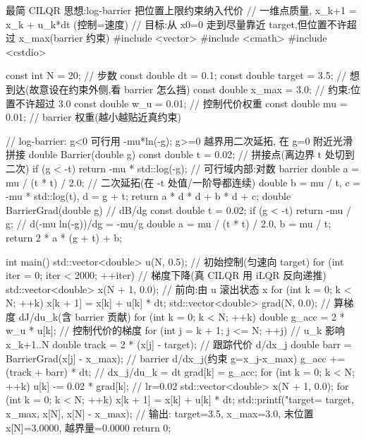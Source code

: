 \begin{codebox}[C++]{最简 CILQR 思想:log-barrier 把位置上限约束纳入代价}
// 一维点质量, x_{k+1} = x_k + u_k*dt (控制=速度)
// 目标:从 x0=0 走到尽量靠近 target,但位置不许超过 x_max(barrier 约束)
#include <vector>
#include <cmath>
#include <cstdio>

const int    N      = 20;       // 步数
const double dt     = 0.1;
const double target = 3.5;      // 想到达(故意设在约束外侧,看 barrier 怎么挡)
const double x_max  = 3.0;      // 约束:位置不许超过 3.0
const double w_u    = 0.01;     // 控制代价权重
const double mu     = 0.01;     // barrier 权重(越小越贴近真约束)

// log-barrier: g<0 可行用 -mu*ln(-g); g>=0 越界用二次延拓, 在 g=0 附近光滑拼接
double Barrier(double g) {
  const double t = 0.02;                          // 拼接点(离边界 t 处切到二次)
  if (g < -t) return -mu * std::log(-g);          // 可行域内部:对数 barrier
  double a = mu / (t * t) / 2.0;                  // 二次延拓(在 -t 处值/一阶导都连续)
  double b = mu / t, c = -mu * std::log(t), d = g + t;
  return a * d * d + b * d + c;
}
double BarrierGrad(double g) {                    // dB/dg
  const double t = 0.02;
  if (g < -t) return -mu / g;                     // d(-mu ln(-g))/dg = -mu/g
  double a = mu / (t * t) / 2.0, b = mu / t;
  return 2 * a * (g + t) + b;
}

int main() {
  std::vector<double> u(N, 0.5);                  // 初始控制(匀速向 target)
  for (int iter = 0; iter < 2000; ++iter) {       // 梯度下降(真 CILQR 用 iLQR 反向递推)
    std::vector<double> x(N + 1, 0.0);            // 前向:由 u 滚出状态 x
    for (int k = 0; k < N; ++k) x[k + 1] = x[k] + u[k] * dt;
    std::vector<double> grad(N, 0.0);             // 算梯度 dJ/du_k(含 barrier 贡献)
    for (int k = 0; k < N; ++k) {
      double g_acc = 2 * w_u * u[k];              // 控制代价的梯度
      for (int j = k + 1; j <= N; ++j) {          // u_k 影响 x_{k+1..N}
        double track = 2 * (x[j] - target);       // 跟踪代价 d/dx_j
        double barr  = BarrierGrad(x[j] - x_max); // barrier d/dx_j(约束 g=x_j-x_max)
        g_acc += (track + barr) * dt;             // dx_j/du_k = dt
      }
      grad[k] = g_acc;
    }
    for (int k = 0; k < N; ++k) u[k] -= 0.02 * grad[k];  // lr=0.02
  }
  std::vector<double> x(N + 1, 0.0);
  for (int k = 0; k < N; ++k) x[k + 1] = x[k] + u[k] * dt;
  std::printf("target=%
              target, x_max, x[N], x[N] - x_max);
  // 输出: target=3.5, x_max=3.0, 末位置 x[N]=3.0000, 越界量=0.0000
  return 0;
}
\end{codebox}

